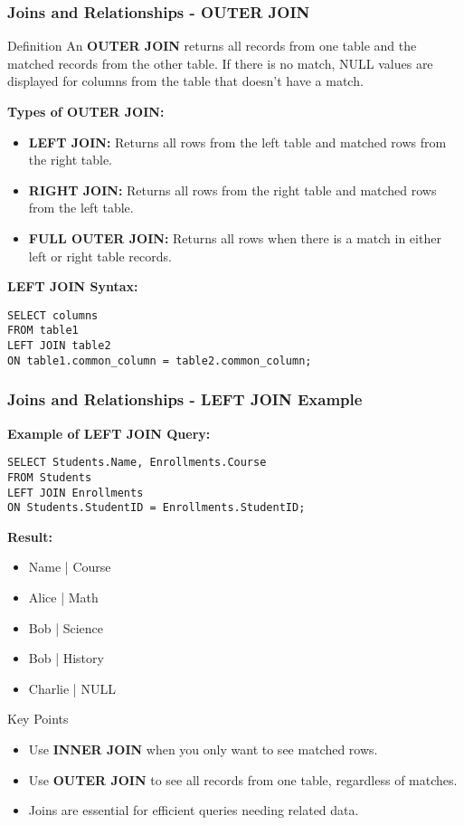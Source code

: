 \documentclass[aspectratio=169]{beamer}
\begin{document}
\begin{frame}[fragile]
    \frametitle{Joins and Relationships - OUTER JOIN}
    \begin{block}{Definition}
        An \textbf{OUTER JOIN} returns all records from one table and the matched records from the other table. If there is no match, NULL values are displayed for columns from the table that doesn't have a match.
    \end{block}

    \textbf{Types of OUTER JOIN:}
    \begin{itemize}
        \item \textbf{LEFT JOIN:} Returns all rows from the left table and matched rows from the right table.
        \item \textbf{RIGHT JOIN:} Returns all rows from the right table and matched rows from the left table.
        \item \textbf{FULL OUTER JOIN:} Returns all rows when there is a match in either left or right table records.
    \end{itemize}
    
    \textbf{LEFT JOIN Syntax:}
    \begin{lstlisting}
SELECT columns
FROM table1
LEFT JOIN table2
ON table1.common_column = table2.common_column;
    \end{lstlisting}
\end{frame}

\begin{frame}[fragile]
    \frametitle{Joins and Relationships - LEFT JOIN Example}
    \textbf{Example of LEFT JOIN Query:}
    \begin{lstlisting}
SELECT Students.Name, Enrollments.Course
FROM Students
LEFT JOIN Enrollments
ON Students.StudentID = Enrollments.StudentID;
    \end{lstlisting}

    \textbf{Result:}
    \begin{itemize}
        \item Name | Course
        \item Alice | Math
        \item Bob | Science
        \item Bob | History
        \item Charlie | NULL
    \end{itemize}

    \begin{block}{Key Points}
    \begin{itemize}
        \item Use \textbf{INNER JOIN} when you only want to see matched rows.
        \item Use \textbf{OUTER JOIN} to see all records from one table, regardless of matches.
        \item Joins are essential for efficient queries needing related data.
    \end{itemize}
    \end{block}
\end{frame}
\end{document}
